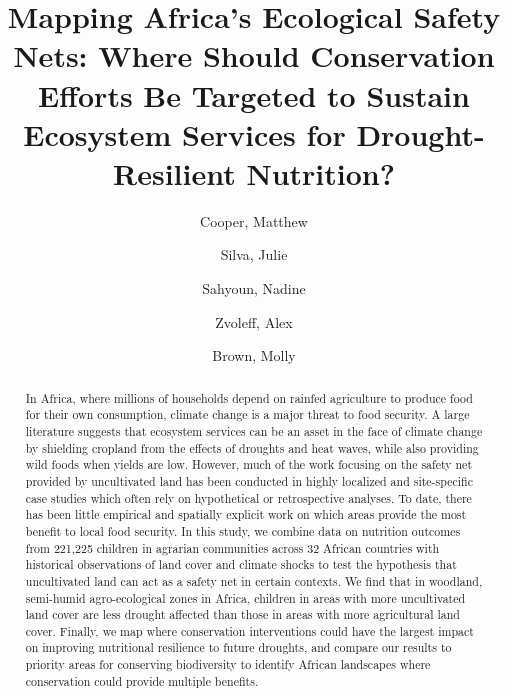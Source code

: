 \documentclass[titlepage]{article}
\begin{document}
\title{Mapping Africa's Ecological Safety Nets: Where Should Conservation Efforts Be Targeted to Sustain Ecosystem Services for Drought-Resilient Nutrition?}

\author[1,2,*]{Cooper, Matthew}
\author[2]{Silva, Julie}
\author[3]{Sahyoun, Nadine}
\author[4]{Zvoleff, Alex}
\author[2]{Brown, Molly}


\maketitle
\begin{abstract}

In Africa, where millions of households depend on rainfed agriculture to produce food for their own consumption, climate change is a major threat to food security.  A large literature suggests that ecosystem services can be an asset in the face of climate change by shielding cropland from the effects of droughts and heat waves, while also providing wild foods when yields are low.  However, much of the work focusing on the safety net provided by uncultivated land has been conducted in highly localized and site-specific case studies which often rely on hypothetical or retrospective analyses.  To date, there has been little empirical and spatially explicit work on which areas provide the most benefit to local food security.  In this study, we combine data on nutrition outcomes from 221,225 children in agrarian communities across 32 African countries with historical observations of land cover and climate shocks to test the hypothesis that uncultivated land can act as a safety net in certain contexts.  We find that in woodland, semi-humid agro-ecological zones in Africa, children in areas with more uncultivated land cover are less drought affected than those in areas with more agricultural land cover.  Finally, we map where conservation interventions could have the largest impact on improving nutritional resilience to future droughts, and compare our results to priority areas for conserving biodiversity to identify African landscapes where conservation could provide multiple benefits.

\end{abstract}
\end{document}
